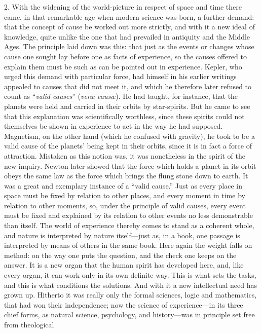 \documentclass[12pt,a4paper]{article}
\newcommand{\opage}[1]{\marginnote{\footnotesize\textit{[#1]}}}
\begin{document}
\medskip

2. With the widening of the world-picture in respect of space and time there came,
in that remarkable age when modern science was born, a further demand: that the
concept of cause be worked out more strictly, and with it a new ideal of knowledge,
quite unlike the one that had prevailed in antiquity and the Middle Ages. The
principle laid down was this: that just as the events or changes whose cause one
sought lay before one as facts of experience, so the causes offered to explain them
must be such as can be pointed out in experience. Kepler, who urged this demand with
particular force, had himself in his earlier writings appealed to causes that did
not meet it, and which he therefore later refused to count as ``\emph{valid causes}''
(\textit{veræ causæ}). He had taught, for instance, that the planets were held and
carried in their orbits by star-spirits. But he came to see that this explanation was
scientifically worthless, since these spirits could not themselves be shown in
experience to act in the way he had supposed. Magnetism, on the other hand (which he
confused with gravity), he took to be a valid cause of the planets' being kept in
their orbits, since it is in fact a force of attraction. Mistaken as this notion was,
it was nonetheless in the \opage{18}spirit of the new inquiry. Newton later showed that the
force which holds a planet in its orbit obeys the same law as the force which brings
the flung stone down to earth. It was a great and exemplary instance of a ``valid
cause.'' Just as every place in space must be fixed by relation to other places, and
every moment in time by relation to other moments, so, under the principle of valid
causes, every event must be fixed and explained by its relation to other events no
less demonstrable than itself. The world of experience thereby comes to stand as a
coherent whole, and nature is interpreted by nature itself---just as, in a book, one
passage is interpreted by means of others in the same book. Here again the weight
falls on method: on the way one puts the question, and the check one keeps on the
answer. It is a new organ that the human spirit has developed here, and, like every
organ, it can work only in its own definite way. This is what sets the tasks, and
this is what conditions the solutions. And with it a new intellectual need has grown
up. Hitherto it was really only the formal sciences, logic and mathematics, that had
won their independence; now the science of experience---in its three chief forms, as
natural science, psychology, and history---was in principle set free from theological
\end{document}
